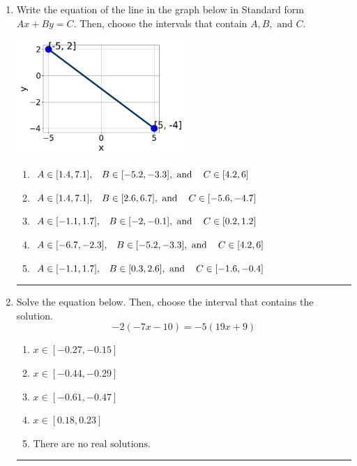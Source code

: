 \documentclass[14pt]{extbook}
\newcommand{\litem}[1]{\item#1\hspace*{-1cm}\rule{\textwidth}{0.4pt}}
\begin{document}
\begin{enumerate}
{\begin{enumerate}[label=\Alph*.]
\end{enumerate} }
\litem{
Write the equation of the line in the graph below in Standard form $Ax+By=C$. Then, choose the intervals that contain $A, B, \text{ and } C$.
\begin{center}
    \includegraphics[width=0.5\textwidth]{../Figures/linearGraphToStandardCopyB.png}
\end{center}
\begin{enumerate}[label=\Alph*.]
\item \( A \in [1.4, 7.1], \hspace{3mm} B \in [-5.2, -3.3], \text{ and } \hspace{3mm} C \in [4.2, 6] \)
\item \( A \in [1.4, 7.1], \hspace{3mm} B \in [2.6, 6.7], \text{ and } \hspace{3mm} C \in [-5.6, -4.7] \)
\item \( A \in [-1.1, 1.7], \hspace{3mm} B \in [-2, -0.1], \text{ and } \hspace{3mm} C \in [0.2, 1.2] \)
\item \( A \in [-6.7, -2.3], \hspace{3mm} B \in [-5.2, -3.3], \text{ and } \hspace{3mm} C \in [4.2, 6] \)
\item \( A \in [-1.1, 1.7], \hspace{3mm} B \in [0.3, 2.6], \text{ and } \hspace{3mm} C \in [-1.6, -0.4] \)

\end{enumerate} }
\litem{
Solve the equation below. Then, choose the interval that contains the solution.\[ -2(-7x -10) = -5(19x + 9) \]\begin{enumerate}[label=\Alph*.]
\item \( x \in [-0.27, -0.15] \)
\item \( x \in [-0.44, -0.29] \)
\item \( x \in [-0.61, -0.47] \)
\item \( x \in [0.18, 0.23] \)
\item \( \text{There are no real solutions.} \)


\end{enumerate}}
\end{enumerate}
\end{document}
